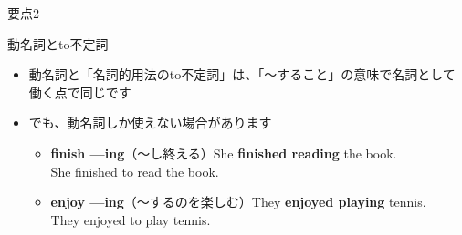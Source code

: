 \documentclass[aspectratio=169,xcolor={dvipsnames,table}]{beamer}
\begin{document}
\begin{frame}[plain]{要点2}

\begin{block}{動名詞とto不定詞}
\begin{itemize}[square]\small
 \item<1->  動名詞と「名詞的用法のto不定詞」は、「〜すること」の意味で名詞として働く点で同じです
 \item<2-> でも、動名詞しか使えない場合があります \dbend
       \begin{itemize}[circle]\small
	\item<3-> \textbf{finish ---ing}（〜し終える）\hfill{\scriptsize She \textbf{finished reading} the book.}\\
\hfill{{\scriptsize *She finished to read the book.}}
	\item<4-> \textbf{enjoy ---ing}（〜するのを楽しむ）\hfill{\scriptsize They \textbf{enjoyed playing} tennis.}\\
\hfill{{\scriptsize *They enjoyed to play tennis.}}
       \end{itemize}
\hfill{}
 \end{itemize}
     \end{block}
\end{frame}
\end{document}
